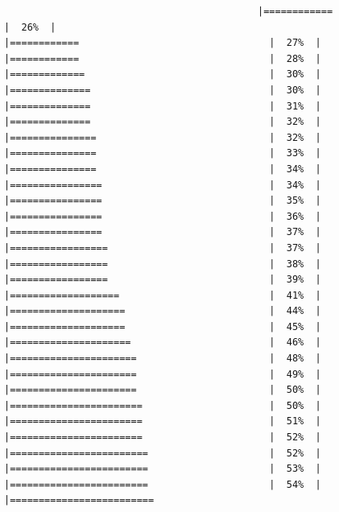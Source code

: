 \documentclass[
  krantz2]{krantz}
\begin{document}
\begin{verbatim}
                                            |============                                 |  26%  |                                                     |============                                 |  27%  |                                                     |============                                 |  28%  |                                                     |=============                                |  30%  |                                                     |==============                               |  30%  |                                                     |==============                               |  31%  |                                                     |==============                               |  32%  |                                                     |===============                              |  32%  |                                                     |===============                              |  33%  |                                                     |===============                              |  34%  |                                                     |================                             |  34%  |                                                     |================                             |  35%  |                                                     |================                             |  36%  |                                                     |================                             |  37%  |                                                     |=================                            |  37%  |                                                     |=================                            |  38%  |                                                     |=================                            |  39%  |                                                     |===================                          |  41%  |                                                     |====================                         |  44%  |                                                     |====================                         |  45%  |                                                     |=====================                        |  46%  |                                                     |======================                       |  48%  |                                                     |======================                       |  49%  |                                                     |======================                       |  50%  |                                                     |=======================                      |  50%  |                                                     |=======================                      |  51%  |                                                     |=======================                      |  52%  |                                                     |========================                     |  52%  |                                                     |========================                     |  53%  |                                                     |========================                     |  54%  |                                                     |=========================         
\end{verbatim}
\end{document}
